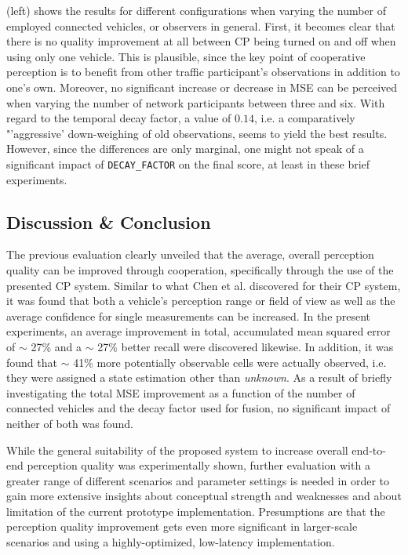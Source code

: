  (left) shows the results for different configurations when varying the number of employed connected vehicles, or observers in general. First, it becomes clear that there is no quality improvement at all between CP being turned on and off when using only one vehicle. This is plausible, since the key point of cooperative perception is to benefit from other traffic participant's observations in addition to one's own. Moreover, no significant increase or decrease in MSE can be perceived when varying the number of network participants between three and six. With regard to the temporal decay factor, a value of $0.14$, i.e. a comparatively "'aggressive' down-weighing of old observations, seems to yield the best results. However, since the differences are only marginal, one might not speak of a significant impact of \texttt{DECAY\_FACTOR} on the final score, at least in these brief experiments.

\subsection{Discussion \& Conclusion}
\label{subsec:evaluation:perception_evaluation:discussion_conclusion}
The previous evaluation clearly unveiled that the average, overall perception quality can be improved through cooperation, specifically through the use of the presented CP system. Similar to what Chen et al. \cite{Chen2019} discovered for their CP system, it was found that both a vehicle's perception range or field of view as well as the average confidence for single measurements can be increased. In the present experiments, an average improvement in total, accumulated mean squared error of $\sim$ 27\% and a $\sim$ 27\% better recall were discovered likewise. In addition, it was found that $\sim$ 41\% more potentially observable cells were actually observed, i.e. they were assigned a state estimation other than \textit{unknown}. As a result of briefly investigating the total MSE improvement as a function of the number of connected vehicles and the decay factor used for fusion, no significant impact of neither of both was found.

While the general suitability of the proposed system to increase overall end-to-end perception quality was experimentally shown, further evaluation with a greater range of different scenarios and parameter settings is needed in order to gain more extensive insights about conceptual strength and weaknesses and about limitation of the current prototype implementation. Presumptions are that the perception quality improvement gets even more significant in larger-scale scenarios and using a highly-optimized, low-latency implementation.

